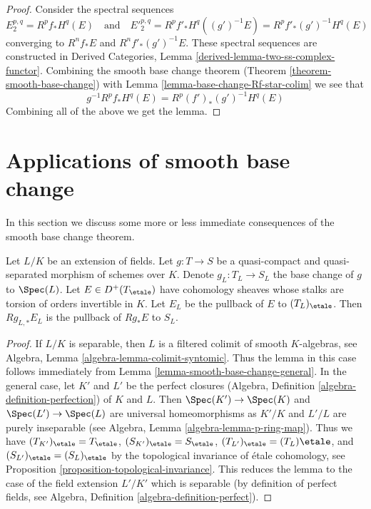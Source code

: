 \begin{proof}
Consider the spectral sequences
$$
E_2^{p, q} = R^pf_*H^q(E)
\quad\text{and}\quad
{E'}_2^{p, q} = R^pf'_*H^q((g')^{-1}E) = R^pf'_*(g')^{-1}H^q(E)
$$
converging to $R^nf_*E$ and $R^nf'_*(g')^{-1}E$.
These spectral sequences are constructed in
Derived Categories, Lemma \ref{derived-lemma-two-ss-complex-functor}.
Combining the smooth base change theorem
(Theorem \ref{theorem-smooth-base-change})
with Lemma \ref{lemma-base-change-Rf-star-colim} we see that
$$
g^{-1}R^pf_*H^q(E) = R^p(f')_*(g')^{-1}H^q(E)
$$
Combining all of the above we get the lemma.
\end{proof}












\section{Applications of smooth base change}
\label{section-applications-smooth-base-change}

\noindent
In this section we discuss some more or less immediate
consequences of the smooth base change theorem.

\begin{lemma}
\label{lemma-base-change-field-extension}
Let $L/K$ be an extension of fields. Let $g : T \to S$ be a quasi-compact
and quasi-separated morphism of schemes over $K$. Denote
$g_L : T_L \to S_L$ the base change of $g$ to $\Spec(L)$.
Let $E \in D^+(T_\etale)$ have cohomology sheaves whose stalks
are torsion of orders invertible in $K$. Let $E_L$ be the
pullback of $E$ to $(T_L)_\etale$. Then
$Rg_{L, *}E_L$ is the pullback of $Rg_*E$ to $S_L$.
\end{lemma}

\begin{proof}
If $L/K$ is separable, then $L$ is a filtered colimit of smooth
$K$-algebras, see
Algebra, Lemma \ref{algebra-lemma-colimit-syntomic}.
Thus the lemma in this case follows immediately from
Lemma \ref{lemma-smooth-base-change-general}.
In the general case, let $K'$ and $L'$ be the perfect closures
(Algebra, Definition \ref{algebra-definition-perfection})
of $K$ and $L$. Then $\Spec(K') \to \Spec(K)$ and
$\Spec(L') \to \Spec(L)$ are universal homeomorphisms
as $K'/K$ and $L'/L$ are purely inseparable
(see Algebra, Lemma \ref{algebra-lemma-p-ring-map}).
Thus we have $(T_{K'})_\etale = T_\etale$,
$(S_{K'})_\etale = S_\etale$,
$(T_{L'})_\etale = (T_L)\etale$, and
$(S_{L'})_\etale = (S_L)_\etale$ by
the topological invariance of \'etale cohomology, see
Proposition \ref{proposition-topological-invariance}.
This reduces the lemma to the case of the field
extension $L'/K'$ which is separable (by definition of
perfect fields, see Algebra, Definition \ref{algebra-definition-perfect}).
\end{proof}

